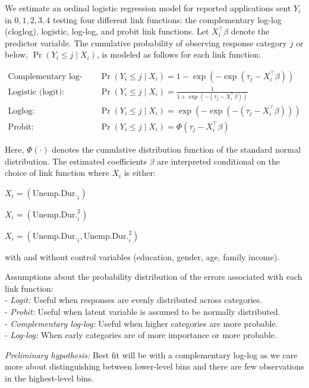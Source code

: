 \documentclass[
]{article}
\begin{document}
We estimate an ordinal logistic regression model for reported
applications sent \(Y_i\) in \({0, 1, 2, 3, 4}\) testing four different
link functions: the complementary log-log (cloglog), logistic, log-log,
and probit link functions. Let \(X_i^\top \beta\) denote the predictor
variable. The cumulative probability of observing response category
\(j\) or below, \(\Pr(Y_i \leq j \mid X_i)\), is modeled as follows for
each link function:

\begin{align*}
\text{Complementary log-log (cloglog):} \quad & \Pr(Y_i \leq j \mid X_i) = 1 - \exp\left( -\exp\left( \tau_j - X_i^\top \beta \right) \right) \\
\text{Logistic (logit):} \quad & \Pr(Y_i \leq j \mid X_i) = \frac{1}{1 + \exp\left( -(\tau_j - X_i^\top \beta) \right)} \\
\text{Loglog:} \quad & \Pr(Y_i \leq j \mid X_i) = \exp\left( -\exp\left( -(\tau_j - X_i^\top \beta) \right) \right) \\
\text{Probit:} \quad & \Pr(Y_i \leq j \mid X_i) = \Phi(\tau_j - X_i^\top \beta)
\end{align*}

Here, \(\Phi(\cdot)\) denotes the cumulative distribution function of
the standard normal distribution. The estimated coefficients \(\beta\)
are interpreted conditional on the choice of link function where \(X_i\)
is either:

\(X_i = \left( \text{Unemp.Dur.}_i \right)\)

\(X_i = \left( \text{Unemp.Dur.}_i^2 \right)\)

\(X_i = \left( \text{Unemp.Dur.}_i, \text{Unemp.Dur.}_i^2 \right)\)

with and without control variables (education, gender, age, family
income).

Assumptions about the probability distribution of the errors associated
with each link function:\\
- \emph{Logit:} Useful when responses are evenly distributed across
categories.\\
- \emph{Probit:} Useful when latent variable is assumed to be normally
distributed.\\
- \emph{Complementary log-log:} Useful when higher categories are more
probable.\\
- \emph{Log-log:} When early categories are of more importance or more
probable.

\emph{Preliminary hypothesis:} Best fit will be with a complementary
log-log as we care more about distinguishing between lower-level bins
and there are few observations in the highest-level bins.
\end{document}
